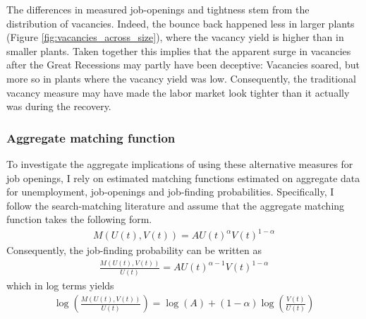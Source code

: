 The differences in measured job-openings and tightness stem from the distribution of vacancies. 
Indeed, the bounce back happened less in larger plants (Figure \ref{fig:vacancies_across_size}), where the vacancy yield is higher than in smaller plants. Taken together this implies that the apparent surge in vacancies after the Great Recessions may partly have been deceptive: Vacancies soared, but more so in plants where the vacancy yield was low. Consequently, the traditional vacancy measure may have made the labor market look tighter than it actually was during the recovery.

\subsubsection{Aggregate matching function}

To investigate the aggregate implications of using these alternative measures for job openings, I rely on estimated matching functions estimated on aggregate data for unemployment, job-openings and job-finding probabilities. Specifically, I follow the search-matching literature and assume that the aggregate matching function takes the following form. 
\begin{align}
M(U(t), V(t))=AU(t)^{\alpha}V(t)^{1-\alpha}
\end{align}
Consequently, the job-finding probability can be written as
\begin{align}
\frac{M(U(t), V(t))}{U(t)}=AU(t)^{\alpha-1} V(t)^{1-\alpha}
\end{align}
which in log terms yields
\begin{align}
\log\left(\frac{M(U(t), V(t))}{U(t)}\right) =\log(A)+\left(1-\alpha\right)\log\left(\frac{V(t)}{U(t)}\right) \label{eq:matching_fct_log}
\end{align}

